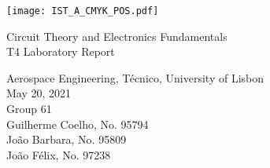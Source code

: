 
\thispagestyle {empty}

\texttt{[image: IST\_A\_CMYK\_POS.pdf]}

\begin{center}
%
\vspace{1.0cm}

\vspace{1cm}
{\FontLb Circuit Theory and Electronics Fundamentals} \\ %
\vspace{3cm}
{\FontSn T4 Laboratory Report} %
\vspace{3cm}
\par
{\FontSn Aerospace Engineering, Técnico, University of Lisbon} \\
\vspace{1cm}
{\FontSn May 20, 2021}\\ %
%
\vspace{1.5cm}
{\FontLb Group 61} \\
\vspace{1cm}
{\FontSn Guilherme Coelho, No. 95794} \\
{\FontSn João Barbara, No. 95809} \\
{\FontSn João Félix, No. 97238} \\
\end{center}
